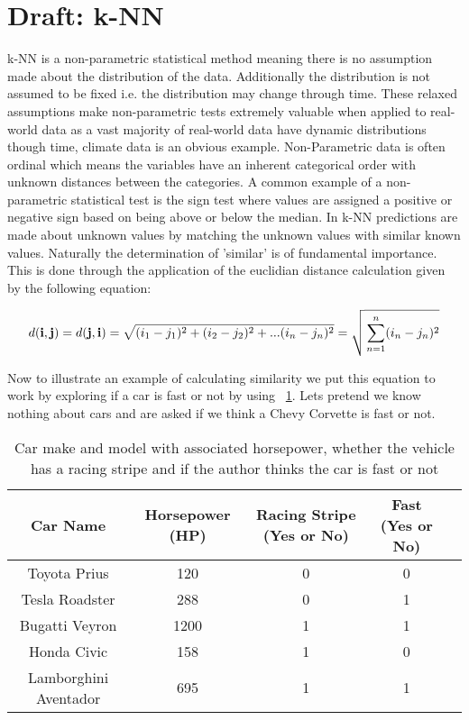 
\section{Draft: k-NN}

k-NN is a non-parametric statistical method meaning there is no
assumption made about the distribution of the data. Additionally the
distribution is not assumed to be fixed i.e. the distribution may
change through time. These relaxed assumptions make non-parametric
tests extremely valuable when applied to real-world data as a vast
majority of real-world data have dynamic distributions though
time, climate data is an obvious example. Non-Parametric data is often ordinal
which means the variables have an inherent categorical order with
unknown distances between the categories. A common example of a
non-parametric statistical test is the sign test where values are
assigned a positive or negative sign based on being above or below the
median. In k-NN predictions are made about unknown values by matching
the unknown values with similar known values. Naturally the
determination of 'similar' is of fundamental importance. This is done
through the application of the euclidian distance calculation given by
the following equation: 

\[{d(\mathbf{i},\mathbf{j})} = {d(\mathbf{j},\mathbf{i})} =
\sqrt{{(i_1 - j_1)^2 + (i_2 - j_2)^2 +... (i_n - j_n)^2 } }  =
\sqrt{\sideset{}{}\sum_{n=1}^n(i_n - j_n)^2}\]

Now to illustrate an example of calculating similarity we put this
equation to work by exploring if a car is fast or not by using
~\ref{T:fast-cars}. Lets pretend we know nothing about cars and are
asked if we think a Chevy Corvette is fast or not.  

\begin{table}[htb]
\caption{Car make and model with associated horsepower, whether the
  vehicle has a racing stripe and if the author thinks the car is fast
or not}\label{T:fast-cars}
\bigskip
\begin{center}
\begin{tabular}{ c c c c c }
 Car Name  & Horsepower (HP)  & Racing Stripe (Yes or No) & Fast (Yes
                                                           or No) \\
\toprule
 Toyota Prius & 120 & 0 & 0 \\ 
 Tesla Roadster& 288 & 0 & 1 \\  
 Bugatti  Veyron& 1200 & 1 & 1 \\
 Honda Civic & 158 & 1 & 0 \\
 Lamborghini Aventador & 695 & 1 & 1 \\

\bottomrule
\end{tabular}
\end{center}
\end{table}

